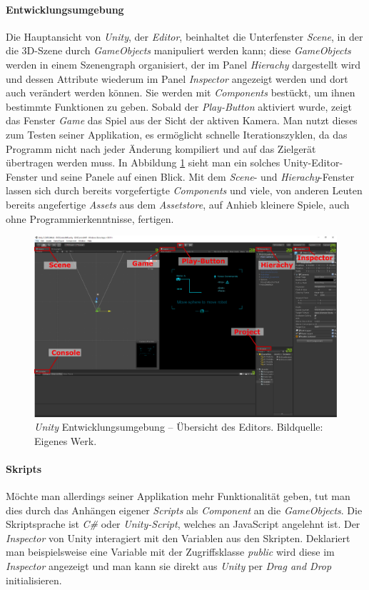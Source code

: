 \paragraph*{Entwicklungsumgebung}
Die Hauptansicht von \textit{Unity}, der \textit{Editor}, beinhaltet die Unterfenster \textit{Scene}, in der die 3D-Szene durch \textit{GameObjects} manipuliert werden kann; diese \textit{GameObjects} werden in einem Szenengraph organisiert, der im Panel \textit{Hierachy} dargestellt wird und dessen Attribute wiederum im Panel \textit{Inspector} angezeigt werden und dort auch verändert werden können. Sie werden mit \textit{Components} bestückt, um ihnen bestimmte Funktionen zu geben. Sobald der \textit{Play-Button} aktiviert wurde, zeigt das Fenster \textit{Game} das Spiel aus der Sicht der aktiven Kamera. Man nutzt dieses zum Testen seiner Applikation, es ermöglicht schnelle Iterationszyklen, da das Programm nicht nach jeder Änderung kompiliert und auf das Zielgerät übertragen werden muss. In Abbildung \ref{fig:unity_editor} sieht man ein solches Unity-Editor-Fenster und seine Panele auf einen Blick. Mit dem \textit{Scene}- und \textit{Hierachy}-Fenster lassen sich durch bereits vorgefertigte \textit{Components} und viele, von anderen Leuten bereits angefertige \textit{Assets} aus dem \textit{Assetstore}, auf Anhieb kleinere Spiele, auch ohne Programmierkenntnisse, fertigen.
\begin{figure}[H]
	\centering
	\includegraphics[width=1.0\textwidth]{figuren/Unity_Editor}
	\caption{\textit{Unity} Entwicklungsumgebung -- Übersicht des Editors. Bildquelle: Eigenes Werk.}
	\label{fig:unity_editor}
\end{figure}
\paragraph*{Skripts}
Möchte man allerdings seiner Applikation mehr Funktionalität geben, tut man dies durch das Anhängen eigener \textit{Scripts} als \textit{Component} an die \textit{GameObjects}. Die Skriptsprache ist \textit{C\#} oder \textit{Unity-Script}, welches an JavaScript angelehnt ist. Der \textit{Inspector} von Unity interagiert mit den Variablen aus den Skripten. Deklariert man beispielsweise eine Variable mit der Zugriffsklasse \textit{public} wird diese im \textit{Inspector} angezeigt und man kann sie direkt aus \textit{Unity} per \textit{Drag and Drop} initialisieren.
